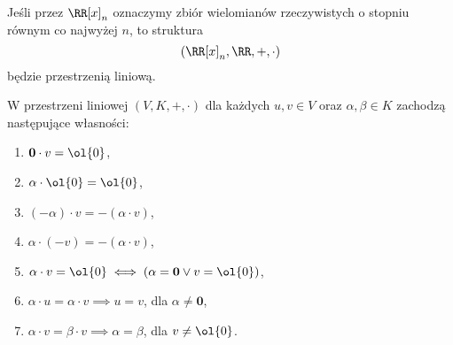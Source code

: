 \begin{example}
    Jeśli przez $\RR[x]_n$ oznaczymy zbiór wielomianów rzeczywistych o stopniu równym co najwyżej $n$, to struktura $$(\RR[x]_n, \RR, +, \cdot)$$
    będzie przestrzenią liniową.
\end{example}

\begin{theorem}
    W przestrzeni liniowej $(V, K, +, \cdot)$ dla każdych $u, v \in V$ oraz $\alpha, \beta \in K$ zachodzą następujące własności:
    \begin{enumerate}
        \item $\mathbf{0} \cdot v = \ol{0}$,
        \item $\alpha \cdot \ol{0} = \ol{0}$,
        \item $(-\alpha) \cdot v = - (\alpha \cdot v)$,
        \item $\alpha \cdot (-v) = - (\alpha \cdot v)$,
        \item $\alpha \cdot v = \ol{0} \iff (\alpha = \mathbf{0} \lor v = \ol{0})$,
        \item $\alpha \cdot u = \alpha \cdot v \implies u = v$, dla $\alpha \neq \mathbf{0}$,
        \item $\alpha \cdot v = \beta \cdot v \implies \alpha = \beta$, dla $v \neq \ol{0}$.
    \end{enumerate}
\end{theorem}
